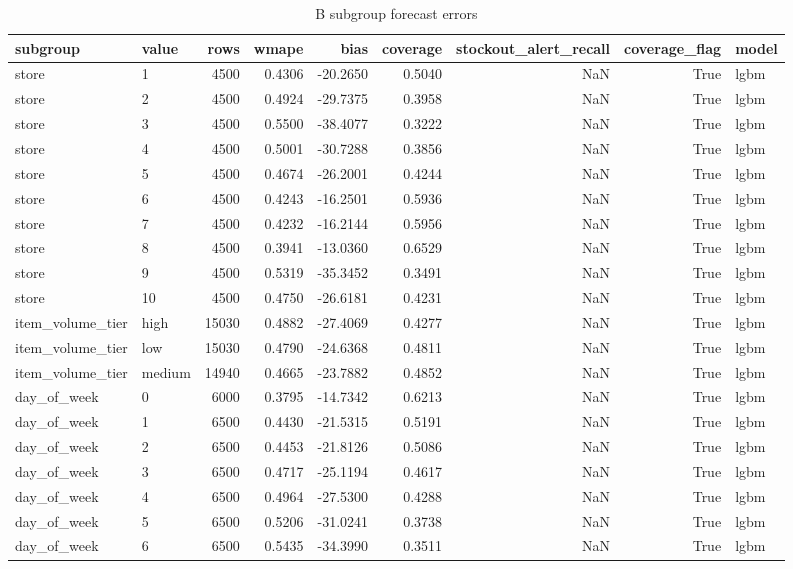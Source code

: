 \begin{table}
\caption{B subgroup forecast errors}
\label{tab:subgroup-errors-B}
\begin{tabular}{llrrrrrrl}
\toprule
subgroup & value & rows & wmape & bias & coverage & stockout\_alert\_recall & coverage\_flag & model \\
\midrule
store & 1 & 4500 & 0.4306 & -20.2650 & 0.5040 & NaN & True & lgbm \\
store & 2 & 4500 & 0.4924 & -29.7375 & 0.3958 & NaN & True & lgbm \\
store & 3 & 4500 & 0.5500 & -38.4077 & 0.3222 & NaN & True & lgbm \\
store & 4 & 4500 & 0.5001 & -30.7288 & 0.3856 & NaN & True & lgbm \\
store & 5 & 4500 & 0.4674 & -26.2001 & 0.4244 & NaN & True & lgbm \\
store & 6 & 4500 & 0.4243 & -16.2501 & 0.5936 & NaN & True & lgbm \\
store & 7 & 4500 & 0.4232 & -16.2144 & 0.5956 & NaN & True & lgbm \\
store & 8 & 4500 & 0.3941 & -13.0360 & 0.6529 & NaN & True & lgbm \\
store & 9 & 4500 & 0.5319 & -35.3452 & 0.3491 & NaN & True & lgbm \\
store & 10 & 4500 & 0.4750 & -26.6181 & 0.4231 & NaN & True & lgbm \\
item\_volume\_tier & high & 15030 & 0.4882 & -27.4069 & 0.4277 & NaN & True & lgbm \\
item\_volume\_tier & low & 15030 & 0.4790 & -24.6368 & 0.4811 & NaN & True & lgbm \\
item\_volume\_tier & medium & 14940 & 0.4665 & -23.7882 & 0.4852 & NaN & True & lgbm \\
day\_of\_week & 0 & 6000 & 0.3795 & -14.7342 & 0.6213 & NaN & True & lgbm \\
day\_of\_week & 1 & 6500 & 0.4430 & -21.5315 & 0.5191 & NaN & True & lgbm \\
day\_of\_week & 2 & 6500 & 0.4453 & -21.8126 & 0.5086 & NaN & True & lgbm \\
day\_of\_week & 3 & 6500 & 0.4717 & -25.1194 & 0.4617 & NaN & True & lgbm \\
day\_of\_week & 4 & 6500 & 0.4964 & -27.5300 & 0.4288 & NaN & True & lgbm \\
day\_of\_week & 5 & 6500 & 0.5206 & -31.0241 & 0.3738 & NaN & True & lgbm \\
day\_of\_week & 6 & 6500 & 0.5435 & -34.3990 & 0.3511 & NaN & True & lgbm \\

\end{tabular}
\end{table}
